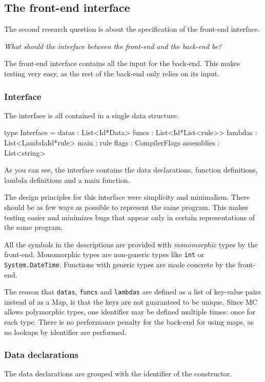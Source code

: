 \subsection{The front-end interface}
The second research question is about the specification of the front-end interface.

\textit{What should the interface between the front-end and the back-end be?}

The front-end interface contains all the input for the back-end.
This makes testing very easy, as the rest of the back-end only relies on its input.

\subsubsection{Interface}
The interface is all contained in a single data structure.

\begin{FS}
type Interface = {
  datas      : List<Id*Data>
  funcs      : List<Id*List<rule>>
  lambdas    : List<LambdaId*rule>
  main       : rule
  flags      : CompilerFlags
  assemblies : List<string> 
}
\end{FS}

As you can see, the interface contains the data declarations, function definitions, lambda definitions and a main function.

The design principles for this interface were simplicity and minimalism.
There should be as few ways as possible to represent the same program.
This makes testing easier and minimizes bugs that appear only in certain representations of the same program.

All the symbols in the descriptions are provided with \textit{monomorphic} types by the front-end.
Monomorphic types are non-generic types like \verb|int| or \verb|System|\verb|.DateTime|.
Functions with generic types are made concrete by the front-end.

The reason that \texttt{datas}, \texttt{funcs} and \texttt{lambdas} are defined as a list of key-value pairs instead of as a Map, is that the keys are not guaranteed to be unique.
Since MC allows polymorphic types, one identifier may be defined multiple times: once for each type.
There is no performance penalty for the back-end for using maps, as no lookups by identifier are performed.

\subsubsection{Data declarations}
The data declarations are grouped with the identifier of the constructor.

